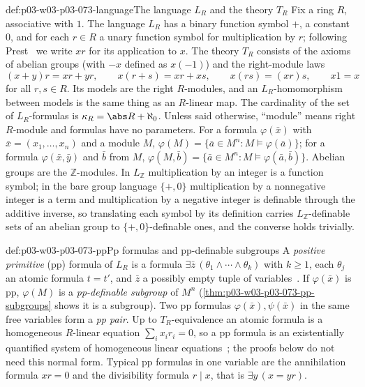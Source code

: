 \begin{hbconvention}{def:p03-w03-p03-073-language}{The language \(L_R\) and the theory \(T_R\)}
Fix a ring \(R\), associative with \(1\). The language \(L_R\) has a
binary function symbol \(+\), a constant \(0\), and for each
\(r\in R\) a unary function symbol for multiplication by \(r\); following
Prest~\cite[\S2]{Prest2020ModelTheoryModules} we write \(xr\) for its
application to \(x\). The theory \(T_R\) consists of the axioms of abelian
groups (with \(-x\) defined as \(x(-1)\)) and the right-module laws
\[
 (x+y)r=xr+yr,\qquad x(r+s)=xr+xs,\qquad x(rs)=(xr)s,\qquad x1=x
\]
for all \(r,s\in R\). Its models are the right \(R\)-modules, and an
\(L_R\)-homomorphism between models is the same thing as an \(R\)-linear
map. The cardinality of the set of \(L_R\)-formulas is
\(\kappa_R=\abs R+\aleph_0\). Unless said otherwise, ``module'' means
right \(R\)-module and formulas have no parameters. For a formula
\(\varphi(\bar x)\) with \(\bar x=(x_1,\ldots,x_n)\) and a module \(M\),
\(\varphi(M)=\{\bar a\in M^n:M\models\varphi(\bar a)\}\); for a formula
\(\varphi(\bar x,\bar y)\) and \(\bar b\) from \(M\),
\(\varphi(M,\bar b)=\{\bar a\in M^n:M\models\varphi(\bar a,\bar b)\}\).
Abelian groups are the \(\mathbb Z\)-modules. In \(L_{\mathbb Z}\)
multiplication by an integer is a function symbol; in the bare group
language \(\{+,0\}\) multiplication by a nonnegative integer is a term and
multiplication by a negative integer is definable through the additive
inverse, so translating each symbol by its definition carries
\(L_{\mathbb Z}\)-definable sets of an abelian group to
\(\{+,0\}\)-definable ones, and the converse holds trivially.
\end{hbconvention}

\begin{hbdefinition}{def:p03-w03-p03-073-pp}{Pp formulas and pp-definable subgroups}
A \emph{positive primitive} (pp) formula of \(L_R\) is a formula
\(\exists\bar z\,(\theta_1\wedge\cdots\wedge\theta_k)\) with \(k\ge1\),
each \(\theta_j\) an atomic formula \(t=t'\), and \(\bar z\) a possibly
empty tuple of variables~\cite[\S3]{Prest2020ModelTheoryModules}. If
\(\varphi(\bar x)\) is pp, \(\varphi(M)\) is a \emph{pp-definable subgroup}
of \(M^n\) (\cref{thm:p03-w03-p03-073-pp-subgroups} shows it is a
subgroup). Two pp formulas \(\varphi(\bar x),\psi(\bar x)\) in the same
free variables form a \emph{pp pair}. Up to \(T_R\)-equivalence an atomic
formula is a homogeneous \(R\)-linear equation
\(\sum_i x_ir_i=0\), so a pp formula is an existentially quantified system
of homogeneous linear equations~\cite[\S3]{Prest2020ModelTheoryModules};
the proofs below do not need this normal form. Typical pp formulas in one
variable are the annihilation formula \(xr=0\) and the divisibility formula
\(r\mid x\), that is \(\exists y\,(x=yr)\).
\end{hbdefinition}

